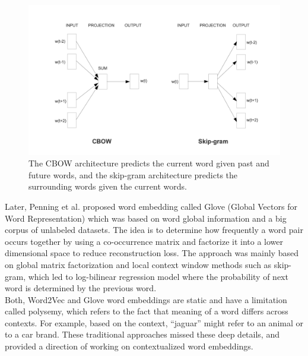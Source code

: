 \documentclass[%
	BCOR=8mm, %
	DIV=12,
	toc=bibliography, %
	toc=listof, %
	oneside, %
	egregdoesnotlikesansseriftitles, %
	]{scrbook}
\begin{document}
\begin{figure}[h!]
    \centering
    \includegraphics[width=0.7\linewidth]{img/cbowandskip.png}
    \caption[Working diagram of CBOW and skip-gram models]{ The CBOW architecture predicts the current word given past and future words, and the skip-gram architecture predicts the surrounding words given the current words.}
    \label{fig:cbow}
\end{figure}
Later, Penning et al. \cite{pennington_glove_2014} proposed word embedding called Glove (Global Vectors for Word Representation) which was based on word global information and a big corpus of unlabeled datasets. The idea is to determine how frequently a word pair occurs together by using a co-occurrence matrix and factorize it into a lower dimensional space to reduce reconstruction loss. The approach was mainly based on global matrix factorization and local context window methods such as skip-gram, which led to log-bilinear regression model where the probability of next word is determined by the previous word.\\
 Both, Word2Vec and Glove word embeddings are static and have a limitation called polysemy, which refers to the fact that meaning of a word differs across contexts. For example, based on the context, ``jaguar'' might refer to an animal or to a car brand. These traditional approaches missed these deep details, and provided a direction of working on contextualized word embeddings.
\end{document}
